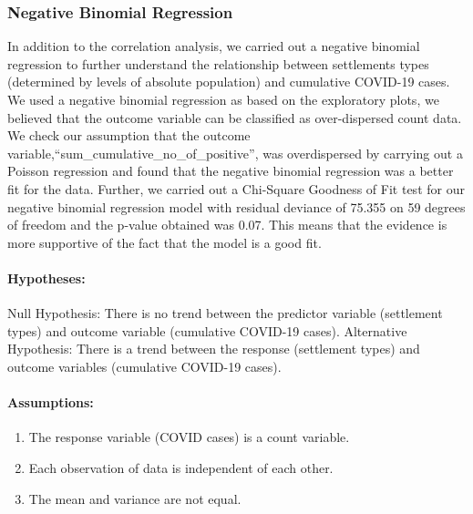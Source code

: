 \documentclass[
  12pt,
]{article}
\providecommand{\tightlist}{%
  \setlength{\itemsep}{0pt}\setlength{\parskip}{0pt}}
\begin{document}
\hypertarget{negative-binomial-regression}{%
\subsubsection{Negative Binomial
Regression}\label{negative-binomial-regression}}

In addition to the correlation analysis, we carried out a negative
binomial regression to further understand the relationship between
settlements types (determined by levels of absolute population) and
cumulative COVID-19 cases. We used a negative binomial regression as
based on the exploratory plots, we believed that the outcome variable
can be classified as over-dispersed count data. We check our assumption
that the outcome variable,``sum\_cumulative\_no\_of\_positive'', was
overdispersed by carrying out a Poisson regression and found that the
negative binomial regression was a better fit for the data. Further, we
carried out a Chi-Square Goodness of Fit test for our negative binomial
regression model with residual deviance of 75.355 on 59 degrees of
freedom and the p-value obtained was 0.07. This means that the evidence
is more supportive of the fact that the model is a good fit.

\hypertarget{hypotheses-2}{%
\paragraph{Hypotheses:}\label{hypotheses-2}}

Null Hypothesis: There is no trend between the predictor variable
(settlement types) and outcome variable (cumulative COVID-19 cases).
Alternative Hypothesis: There is a trend between the response
(settlement types) and outcome variables (cumulative COVID-19 cases).

\hypertarget{assumptions-2}{%
\paragraph{Assumptions:}\label{assumptions-2}}

\begin{enumerate}
\def\labelenumi{\arabic{enumi}.}
\tightlist
\item
  The response variable (COVID cases) is a count variable.
\item
  Each observation of data is independent of each other.
\item
  The mean and variance are not equal.
\end{enumerate}
\end{document}
